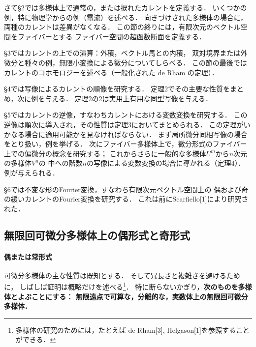 さて\S2では多様体上で通常の，または捩れたカレントを定義する．
いくつかの例，特に物理学からの例（電流）を述べる．
向きづけされた多様体の場合に，両種のカレントは差異がなくなる．
この節の終りには，有限次元のベクトル空間をファイバーとする
ファイバー空間の超函数断面を定義する．

\S3ではカレントの上での演算：外積，ベクトル馬との内積，
双対境界または外微分と種々の例，無限小変換による微分についてしらべる．
この節の最後では
カレントのコホモロジーを述べる（一般化された de Rham の定理）．

\S4では写像によるカレントの順像を研究する．
定理2でその主要な性質をまとめ，次に例を与える．
定理2の2は実用上有用な同型写像を与える．

\S5ではカレントの逆像，すなわちカレントにおける変数変換を研究する．
この逆像は順次に導入され，その性質は定理3においてまとめられる．
この定理がいかなる場合に適用可能かを見なければならない．
まず局所微分同相写像の場合をとり扱い，例を挙げる．
次にファイバー多様体上で，微分形式のファイバー上での偏微分の概念を研究する；
これからさらに一般的な多様体\(U^m\)から\(n\)次元の多様体\(V^n\)の
中への階数\(n\)の写像による変数変換の場合に導かれる（定理4）．
例が与えられる．

\S6では不変な形のFourier変換，すなわち有限次元ベクトル空間上の
偶および奇の緩いカレントのFourier変換を研究する．
これは前にScarfiello[1]により研究された．

\subsection{無限回可微分多様体上の偶形式と奇形式}
\paragraph{偶または常形式}
可微分多様体の主な性質は既知とする．
そして冗長さと複雑さを避けるために，
しばしば証明は概略だけを述べる\footnote{
    多様体の研究のためには，たとえば 
    de Rham[3], Helgason[1]を参照することができる．
}．
特に断らないかぎり，\textbf{次のものを多様体とよぶことにする：
無限遠点で可算な，分離的な，実数体上の無限回可微分多様体．}

